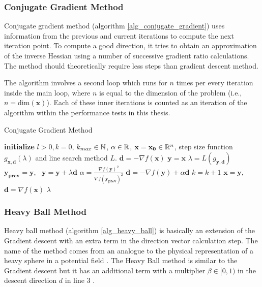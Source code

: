 \documentclass[a4paper,english,titlepage,12pt]{article}
\newcommand{\vect}[1]{\ensuremath{\mathbf{#1}}}
\newcommand{\norm}[1]{\ensuremath\Vert #1 \Vert}
\newcommand{\R}{\ensuremath\mathbb{R}}
\newcommand{\N}{\ensuremath\mathbb{N}}
\begin{document}
\subsubsection{Conjugate Gradient Method}


Conjugate gradient method (algorithm \ref{alg_conjugate_gradient}) uses information from the previous and current iterations to compute the next iteration point. To compute a good direction, it tries to obtain an approximation of the inverse Hessian using a number of successive gradient ratio calculations. The method should theoretically require less steps than gradient descent method. \cite{book:introduction_continuous_optimization}

The algorithm involves a second loop which runs for $n$ times per every iteration inside the main loop, where $n$ is equal to the dimension of the problem (i.e., $n = \mathrm{dim}(\vect{x})$). Each of these inner iterations is counted as an iteration of the algorithm within the performance tests in this thesis.

\begin{algorithm}[H]
\caption{Conjugate Gradient Method}
\label{alg_conjugate_gradient}
\begin{algorithmic}[1]
\STATE \textbf{initialize} $l > 0, k = 0$, $k_{max} \in \N$, $\alpha \in \R$, $\vect{x} = \vect{x_0} \in \R^n$, step size function $g_{\vect{x}, \vect{d}}(\lambda)$ and line search method $L$.
\STATE $\vect{d} = -\nabla f(\vect{x})$
\WHILE{$\norm{\nabla f(\vect{x})} > l$ \AND $k < k_{max}$}
    \STATE $\vect{y} = \vect{x}$
        \STATE $\lambda = L(g_{\vect{y}, \vect{d}})$
        \STATE $\vect{y_{prev}} = \vect{y}$, \ $\vect{y} = \vect{y} + \lambda \vect{d}$
        \STATE $\alpha = \frac{\nabla f(\vect{y})^2}{\nabla f(\vect{y_{prev}})^2}$
        \STATE $\vect{d} = -\nabla f(\vect{y}) + \alpha \vect{d}$
        \STATE $k = k + 1$
    \ENDFOR
    \STATE $\vect{x} = \vect{y}$, \ $\vect{d} = \nabla f(\vect{x})$
\ENDWHILE
\RETURN $\lambda$
\end{algorithmic}
\end{algorithm}


\subsubsection{Heavy Ball Method}


Heavy ball method (algorithm \ref{alg_heavy_ball}) is basically an extension of the Gradient descent with an extra term in the direction vector calculation step. The name of the method comes from an analogue to the physical representation of a heavy sphere in a potential field \cite{book:heavy_ball_origin}. The Heavy Ball method is similar to the Gradient descent but it has an additional term with a multiplier $\beta \in [0, 1)$ in the descent direction $d$ in line 3 \cite{ghadimi2014global}.
\end{document}
